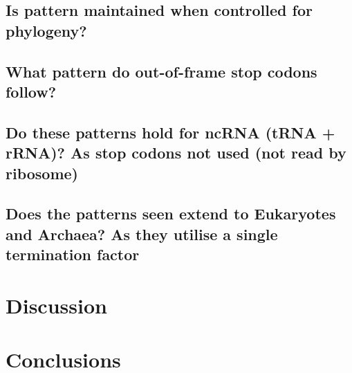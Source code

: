 \documentclass[
    emulatestandardclasses,
    parskip=half,
]{scrartcl}
\begin{document}
        \subsection{Is pattern maintained when controlled for phylogeny?}
        \subsection{What pattern do out-of-frame stop codons follow?}
        \subsection{Do these patterns hold for ncRNA (tRNA + rRNA)?
                    As stop codons not used (not read by ribosome)}
        \subsection{Does the patterns seen extend to Eukaryotes and Archaea?
                    As they utilise a single termination factor}
    \section{Discussion}

    \section{Conclusions}

	\newpage {}
	\printbibliography
	\appendix\appendixpage
\end{document}
